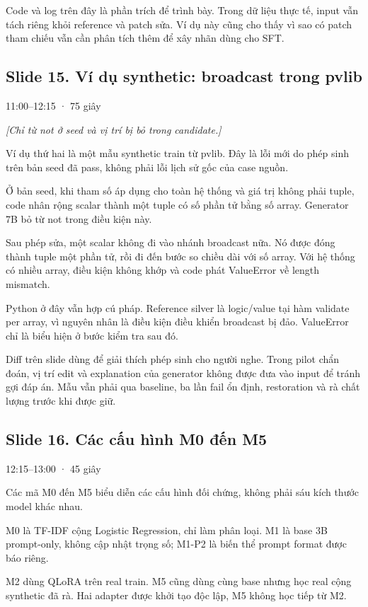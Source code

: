 \documentclass[12pt,a4paper]{article}
\begin{document}
Code và log trên đây là phần trích để trình bày. Trong dữ liệu thực tế, input vẫn tách riêng khỏi reference và patch sửa. Ví dụ này cũng cho thấy vì sao có patch tham chiếu vẫn cần phân tích thêm để xây nhãn dùng cho SFT.

\clearpage
\subsection*{Slide 15. Ví dụ synthetic: broadcast trong pvlib}
{\small\color{gray}11:00–12:15 · 75 giây}\par
{\itshape\color{gray}[Chỉ từ not ở seed và vị trí bị bỏ trong candidate.]}\par
Ví dụ thứ hai là một mẫu synthetic train từ pvlib. Đây là lỗi mới do phép sinh trên bản seed đã pass, không phải lỗi lịch sử gốc của case nguồn.

Ở bản seed, khi tham số áp dụng cho toàn hệ thống và giá trị không phải tuple, code nhân rộng scalar thành một tuple có số phần tử bằng số array. Generator 7B bỏ từ not trong điều kiện này.

Sau phép sửa, một scalar không đi vào nhánh broadcast nữa. Nó được đóng thành tuple một phần tử, rồi đi đến bước so chiều dài với số array. Với hệ thống có nhiều array, điều kiện không khớp và code phát ValueError về length mismatch.

Python ở đây vẫn hợp cú pháp. Reference silver là logic/value tại hàm validate per array, vì nguyên nhân là điều kiện điều khiển broadcast bị đảo. ValueError chỉ là biểu hiện ở bước kiểm tra sau đó.

Diff trên slide dùng để giải thích phép sinh cho người nghe. Trong pilot chẩn đoán, vị trí edit và explanation của generator không được đưa vào input để tránh gợi đáp án. Mẫu vẫn phải qua baseline, ba lần fail ổn định, restoration và rà chất lượng trước khi được giữ.

\subsection*{Slide 16. Các cấu hình M0 đến M5}
{\small\color{gray}12:15–13:00 · 45 giây}\par
Các mã M0 đến M5 biểu diễn các cấu hình đối chứng, không phải sáu kích thước model khác nhau.

M0 là TF-IDF cộng Logistic Regression, chỉ làm phân loại. M1 là base 3B prompt-only, không cập nhật trọng số; M1-P2 là biến thể prompt format được báo riêng.

M2 dùng QLoRA trên real train. M5 cũng dùng cùng base nhưng học real cộng synthetic đã rà. Hai adapter được khởi tạo độc lập, M5 không học tiếp từ M2.
\end{document}
